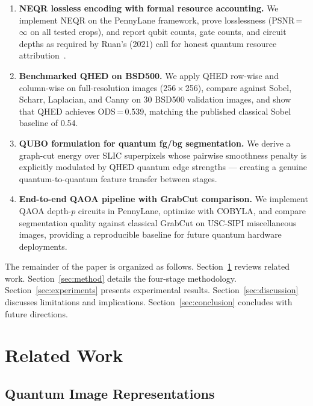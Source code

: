 \documentclass[journal]{IEEEtran}
\begin{document}
\begin{enumerate}
  \item \textbf{NEQR lossless encoding with formal resource accounting.}
    We implement NEQR on the PennyLane framework, prove losslessness
    (PSNR\,=\,$\infty$ on all tested crops), and report qubit counts, gate
    counts, and circuit depths as required by Ruan's (2021) call for honest
    quantum resource attribution~\cite{ruan2021opportunities}.

  \item \textbf{Benchmarked QHED on BSD500.}
    We apply QHED row-wise and column-wise on full-resolution images
    (256\,$\times$\,256), compare against Sobel, Scharr, Laplacian, and Canny
    on 30 BSD500 validation images, and show that QHED achieves ODS\,=\,0.539,
    matching the published classical Sobel baseline of 0.54.

  \item \textbf{QUBO formulation for quantum fg/bg segmentation.}
    We derive a graph-cut energy over SLIC superpixels whose pairwise
    smoothness penalty is explicitly modulated by QHED quantum edge
    strengths — creating a genuine quantum-to-quantum feature transfer between
    stages.

  \item \textbf{End-to-end QAOA pipeline with GrabCut comparison.}
    We implement QAOA depth-$p$ circuits in PennyLane, optimize with COBYLA,
    and compare segmentation quality against classical GrabCut on USC-SIPI
    miscellaneous images, providing a reproducible baseline for future
    quantum hardware deployments.
\end{enumerate}

The remainder of the paper is organized as follows.
Section~\ref{sec:related} reviews related work.
Section~\ref{sec:method} details the four-stage methodology.
Section~\ref{sec:experiments} presents experimental results.
Section~\ref{sec:discussion} discusses limitations and implications.
Section~\ref{sec:conclusion} concludes with future directions.

\section{Related Work}
\label{sec:related}

\subsection{Quantum Image Representations}
\end{document}
